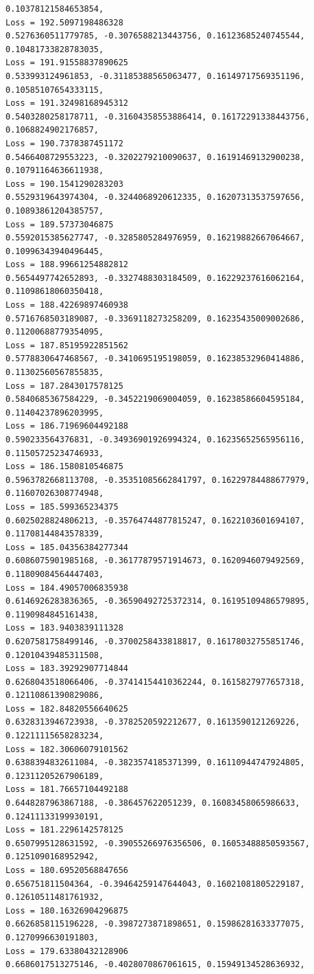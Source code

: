 \documentclass[11pt]{article}
\begin{document}
\begin{Verbatim}[commandchars=\\\{\}]
0.10378121584653854,
Loss = 192.5097198486328
0.5276360511779785, -0.3076588213443756, 0.16123685240745544,
0.10481733828783035,
Loss = 191.91558837890625
0.533993124961853, -0.31185388565063477, 0.16149717569351196,
0.10585107654333115,
Loss = 191.32498168945312
0.5403280258178711, -0.31604358553886414, 0.16172291338443756,
0.1068824902176857,
Loss = 190.7378387451172
0.5466408729553223, -0.3202279210090637, 0.16191469132900238,
0.10791164636611938,
Loss = 190.1541290283203
0.5529319643974304, -0.3244068920612335, 0.16207313537597656,
0.10893861204385757,
Loss = 189.57373046875
0.5592015385627747, -0.3285805284976959, 0.16219882667064667,
0.10996343940496445,
Loss = 188.99661254882812
0.5654497742652893, -0.3327488303184509, 0.16229237616062164,
0.11098618060350418,
Loss = 188.42269897460938
0.5716768503189087, -0.3369118273258209, 0.16235435009002686,
0.11200688779354095,
Loss = 187.85195922851562
0.5778830647468567, -0.3410695195198059, 0.16238532960414886,
0.11302560567855835,
Loss = 187.2843017578125
0.5840685367584229, -0.3452219069004059, 0.16238586604595184,
0.11404237896203995,
Loss = 186.71969604492188
0.590233564376831, -0.34936901926994324, 0.16235652565956116,
0.11505725234746933,
Loss = 186.1580810546875
0.5963782668113708, -0.35351085662841797, 0.16229784488677979,
0.11607026308774948,
Loss = 185.599365234375
0.6025028824806213, -0.35764744877815247, 0.1622103601694107,
0.11708144843578339,
Loss = 185.04356384277344
0.6086075901985168, -0.36177879571914673, 0.1620946079492569,
0.11809084564447403,
Loss = 184.49057006835938
0.6146926283836365, -0.36590492725372314, 0.16195109486579895,
0.1190984845161438,
Loss = 183.9403839111328
0.6207581758499146, -0.3700258433818817, 0.16178032755851746,
0.12010439485311508,
Loss = 183.39292907714844
0.6268043518066406, -0.37414154410362244, 0.1615827977657318,
0.12110861390829086,
Loss = 182.84820556640625
0.6328313946723938, -0.3782520592212677, 0.1613590121269226,
0.12211115658283234,
Loss = 182.30606079101562
0.6388394832611084, -0.3823574185371399, 0.16110944747924805,
0.12311205267906189,
Loss = 181.76657104492188
0.6448287963867188, -0.386457622051239, 0.16083458065986633,
0.12411133199930191,
Loss = 181.2296142578125
0.6507995128631592, -0.39055266976356506, 0.16053488850593567,
0.1251090168952942,
Loss = 180.69520568847656
0.656751811504364, -0.39464259147644043, 0.16021081805229187,
0.12610511481761932,
Loss = 180.16326904296875
0.6626858115196228, -0.3987273871898651, 0.15986281633377075,
0.1270996630191803,
Loss = 179.63380432128906
0.6686017513275146, -0.4028070867061615, 0.15949134528636932,

\end{Verbatim}
\end{document}
